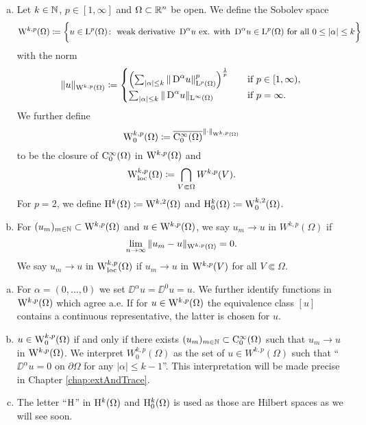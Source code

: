 \begin{defn}
  \begin{enumerate}[a)]
    \item Let $k \in \mathbb{N}$, $p \in [1,\infty]$ and $\Omega \subset \mathbb{R}^n$ be open. 
      We define the Sobolev space
      $$
      \mathrm{W}^{k,p}(\Omega) \coloneqq \bigg\{u \in \mathrm{L}^p(\Omega) \colon \text{ weak derivative } \,{\operatorname{D}}^\alpha u \text{ ex. with } \,{\operatorname{D}}^\alpha u \in \mathrm{L}^p(\Omega) \text{ for all } 0 \leq |\alpha| \leq k \bigg\}
      $$
      with the norm
      $$
      \|u\|_{\mathrm{W}^{k,p}(\Omega)} \coloneqq 
      \begin{cases}
        \left( \sum_{|\alpha| \leq k} \|\,{\operatorname{D}}^\alpha u\|_{\mathrm{L}^p(\Omega)}^p \right)^{\frac{1}{p}} &\quad\text{if } p \in [1,\infty), \\
          \sum_{|\alpha| \leq k} \|\,{\operatorname{D}}^\alpha u\|_{\mathrm{L}^\infty(\Omega)} &\quad\text{if } p = \infty.
      \end{cases}
      $$
      We further define
      $$
      \mathrm{W}_0^{k,p}(\Omega) \coloneqq \overline{\mathrm{C}_0^\infty(\Omega)}^{\|\cdot\|_{\mathrm{W}^{k,p}(\Omega)}}
      $$
      to be the closure of $\mathrm{C}_0^\infty(\Omega)$ in $\mathrm{W}^{k,p}(\Omega)$ and
      $$
      \mathrm{W}_{\operatorname{loc}}^{k,p}(\Omega) \coloneqq \bigcap_{V \Subset \Omega} W^{k,p}(V).
      $$
      For $p = 2$, we define $\mathrm{H}^k(\Omega) \coloneqq \mathrm{W}^{k,2}(\Omega)$ and $\mathrm{H}_0^k(\Omega) \coloneqq \mathrm{W}_0^{k,2}(\Omega)$.
    \item For $(u_m)_{m \in \mathbb{N}} \subset \mathrm{W}^{k,p}(\Omega)$ and $u \in \mathrm{W}^{k,p}(\Omega)$, we say $u_m \to u$ in $W^{k,p}(\Omega)$ if $$\lim_{n \to \infty} \|u_m - u\|_{\mathrm{W}^{k,p}(\Omega)} = 0.$$  
      We say $u_m \to u$ in $\mathrm{W}_{\operatorname{loc}}^{k,p}(\Omega)$ if $u_m \to u$ in $\mathrm{W}^{k,p}(V)$ for all $V \Subset \Omega$.
  \end{enumerate}
\end{defn}

\begin{rem}
  \begin{enumerate}[a)]
    \item For $\alpha = (0,\dots,0)$ we set $\DD^\alpha u = \DD^0 u = u$.
      We further identify functions in $\mathrm{W}^{k,p}(\Omega)$ which agree a.e.
      If for $u \in \mathrm{W}^{k,p}(\Omega)$ the equivalence class $[u]$ contains a continuous representative, the latter is chosen for $u$.
    \item $u \in \mathrm{W}_0^{k,p}(\Omega)$ if and only if there exists $(u_m)_{m \in \mathbb{N}} \subset \mathrm{C}_0^\infty(\Omega)$ such that $u_m \to u$ in $\mathrm{W}^{k,p}(\Omega)$.
      We interpret $W_0^{k,p}(\Omega)$ as the set of $u \in W^{k,p}(\Omega)$ such that ``$\DD^\alpha u = 0$ on $\partial \Omega$ for any $|\alpha| \leq k - 1$''.
      This interpretation will be made precise in Chapter \ref{chap:extAndTrace}.
    \item The letter ``$\mathrm{H}$'' in $\mathrm{H}^k(\Omega)$ and $\mathrm{H}_0^k(\Omega)$ is used as those are Hilbert spaces as we will see soon.
  \end{enumerate}
\end{rem}

